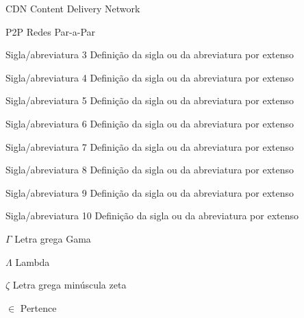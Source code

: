\documentclass[
	12pt,				%
	oneside,			%
	a4paper,			%
	english,			%
	brazil				%
	]{abntex2ppgsi}
\begin{document}
\listofalgorithms
\cleardoublepage

\listoftables*
\cleardoublepage

%
%
\begin{siglas}
  \item[CDN] Content Delivery Network
  \item[P2P] Redes Par-a-Par
  \item[Sigla/abreviatura 3] Definição da sigla ou da abreviatura por extenso
  \item[Sigla/abreviatura 4] Definição da sigla ou da abreviatura por extenso
  \item[Sigla/abreviatura 5] Definição da sigla ou da abreviatura por extenso
  \item[Sigla/abreviatura 6] Definição da sigla ou da abreviatura por extenso
  \item[Sigla/abreviatura 7] Definição da sigla ou da abreviatura por extenso
  \item[Sigla/abreviatura 8] Definição da sigla ou da abreviatura por extenso
  \item[Sigla/abreviatura 9] Definição da sigla ou da abreviatura por extenso
  \item[Sigla/abreviatura 10] Definição da sigla ou da abreviatura por extenso
\end{siglas}

%
% 
\begin{simbolos}
  \item[$ \Gamma $] Letra grega Gama
  \item[$ \Lambda $] Lambda
  \item[$ \zeta $] Letra grega minúscula zeta
  \item[$ \in $] Pertence
\end{simbolos}
\end{document}

